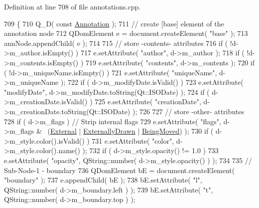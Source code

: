 Definition at line 708 of file annotations.\+cpp.


\begin{DoxyCode}
709 \{
710     Q\_D( \textcolor{keyword}{const} \hyperlink{classOkular_1_1Annotation}{Annotation} );
711     \textcolor{comment}{// create [base] element of the annotation node}
712     QDomElement e = document.createElement( \textcolor{stringliteral}{"base"} );
713     annNode.appendChild( e );
714 
715     \textcolor{comment}{// store -contents- attributes}
716     \textcolor{keywordflow}{if} ( !d->m\_author.isEmpty() )
717         e.setAttribute( \textcolor{stringliteral}{"author"}, d->m\_author );
718     \textcolor{keywordflow}{if} ( !d->m\_contents.isEmpty() )
719         e.setAttribute( \textcolor{stringliteral}{"contents"}, d->m\_contents );
720     \textcolor{keywordflow}{if} ( !d->m\_uniqueName.isEmpty() )
721         e.setAttribute( \textcolor{stringliteral}{"uniqueName"}, d->m\_uniqueName );
722     \textcolor{keywordflow}{if} ( d->m\_modifyDate.isValid() )
723         e.setAttribute( \textcolor{stringliteral}{"modifyDate"}, d->m\_modifyDate.toString(Qt::ISODate) );
724     \textcolor{keywordflow}{if} ( d->m\_creationDate.isValid() )
725         e.setAttribute( \textcolor{stringliteral}{"creationDate"}, d->m\_creationDate.toString(Qt::ISODate) );
726 
727     \textcolor{comment}{// store -other- attributes}
728     \textcolor{keywordflow}{if} ( d->m\_flags ) \textcolor{comment}{// Strip internal flags}
729         e.setAttribute( \textcolor{stringliteral}{"flags"}, d->m\_flags & ~(\hyperlink{classOkular_1_1Annotation_a8a214541446745761efeda70b3a4302eabe908102c97a725aa1928602f17833c0}{External} | 
      \hyperlink{classOkular_1_1Annotation_a8a214541446745761efeda70b3a4302ea75f088f5533ace9d9d47a506b707f5a1}{ExternallyDrawn} | \hyperlink{classOkular_1_1Annotation_a8a214541446745761efeda70b3a4302ea9cd51e0fe53aac93798a205e7fb5c04a}{BeingMoved}) );
730     \textcolor{keywordflow}{if} ( d->m\_style.color().isValid() )
731         e.setAttribute( \textcolor{stringliteral}{"color"}, d->m\_style.color().name() );
732     \textcolor{keywordflow}{if} ( d->m\_style.opacity() != 1.0 )
733         e.setAttribute( \textcolor{stringliteral}{"opacity"}, QString::number( d->m\_style.opacity() ) );
734 
735     \textcolor{comment}{// Sub-Node-1 - boundary}
736     QDomElement bE = document.createElement( \textcolor{stringliteral}{"boundary"} );
737     e.appendChild( bE );
738     bE.setAttribute( \textcolor{stringliteral}{"l"}, QString::number( d->m\_boundary.left ) );
739     bE.setAttribute( \textcolor{stringliteral}{"t"}, QString::number( d->m\_boundary.top ) );

\end{DoxyCode}
